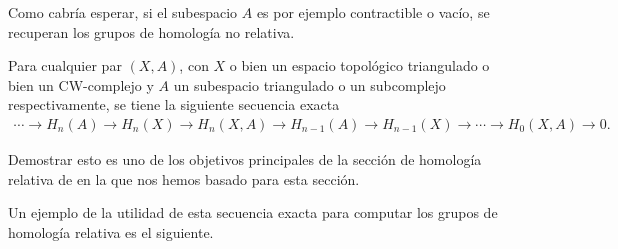 \begin{nota}
    Como cabría esperar, si el subespacio $A$ es por ejemplo contractible o vacío, se recuperan los grupos de homología no relativa.
\end{nota}
\bigskip

\begin{proposition}
\label{exact_sec_hom_rel}
    Para cualquier par $(X,A)$, con $X$ o bien un espacio topológico triangulado o bien un CW-complejo y $A$ un subespacio triangulado o un subcomplejo respectivamente, se tiene la siguiente secuencia exacta
    \begin{align*}
        \cdots \longrightarrow H_n(A) \longrightarrow H_n(X) \longrightarrow H_n(X,A) \longrightarrow H_{n-1}(A) \longrightarrow H_{n-1}(X) \longrightarrow \cdots \longrightarrow H_0(X,A) \longrightarrow 0.
    \end{align*}
\end{proposition}

Demostrar esto es uno de los objetivos principales de la sección de homología relativa de \cite[p.~115]{hatcher2002} en la que nos hemos basado para esta sección.

\bigskip

Un ejemplo de la utilidad de esta secuencia exacta para computar los grupos de homología relativa es el siguiente.


